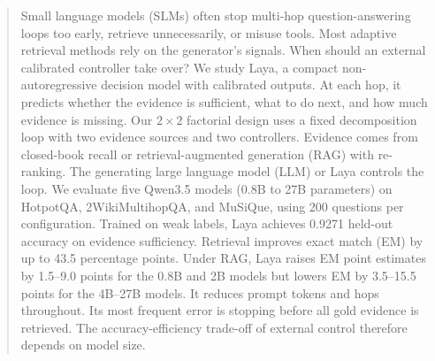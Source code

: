 \begin{abstract}
Small language models (SLMs) often stop multi-hop question-answering loops too early,
retrieve unnecessarily, or misuse tools. Most adaptive retrieval methods rely on the
generator's signals. When should an external calibrated controller take over?
We study Laya, a compact non-autoregressive decision model with calibrated outputs. At
each hop, it predicts whether the evidence is sufficient, what to do next, and how much
evidence is missing. Our $2\times2$ factorial design uses a fixed decomposition loop
with two evidence sources and two controllers. Evidence comes from closed-book recall
or retrieval-augmented generation (RAG) with re-ranking. The generating large language
model (LLM) or Laya controls the loop. We evaluate five Qwen3.5 models (0.8B to 27B
parameters) on HotpotQA, 2WikiMultihopQA, and MuSiQue, using 200 questions per
configuration. Trained on weak labels, Laya achieves 0.9271 held-out accuracy on evidence
sufficiency. Retrieval improves exact match (EM) by up to 43.5 percentage points. Under
RAG, Laya raises EM point estimates by 1.5--9.0 points for the 0.8B and 2B models but
lowers EM by 3.5--15.5 points for the 4B--27B models. It reduces prompt tokens and hops
throughout. Its most frequent error is stopping before all gold evidence is retrieved.
The accuracy-efficiency trade-off of external control therefore depends on model size.
\end{abstract}

